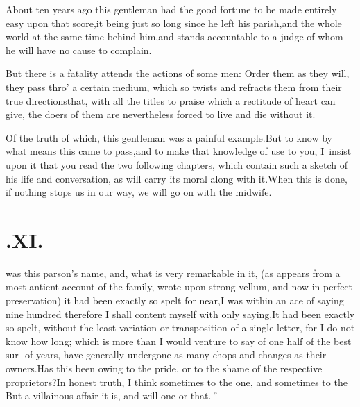 \documentclass{article}
\begin{document}
About ten years ago this gentleman had the good fortune to be
made entirely easy upon that score,\tsk  it being just so long
since he left his parish,\tsk  and the whole world at the same
time behind him,\tsk  and stands accountable to a judge of whom he
will have no cause to complain.

But there is a fatality attends the actions of some men: Order
them as they will, they pass thro’ a certain medium, which so twists and refracts them from their true
directions\tsh  that, with all the titles to praise which a
rectitude of heart can give, the doers of them are nevertheless
forced to live and die without it.

Of the truth of which, this gentleman was a painful
example.\tsh  But to know by what means this came to
pass,\tsk  and to make that knowledge of use to you, I~insist upon
it that you read the two following chapters, which contain such a
sketch of his life and conversation, as will carry its moral along
with it.\tsk  When this is done, if nothing stops us in our way,
we will go on with the midwife.

\section{.\enspace XI.}

 was this parson’s name, and, what is very remarkable in it, (as
appears from a most antient account of the family, wrote upon strong vellum, and
now in perfect preservation) it had been exactly so spelt for near,\tsk  I was
within an ace of saying nine hundred\break
{}
therefore I
shall content myself with only saying,\tsh  It had been exactly so spelt, without the
least variation or transposition of a single letter, for I do not know how long;
which is more than I would venture to say of one half of the best sur-\break 
{} of years, have generally undergone as many chops and
changes as their owners.\tsk  Has this been owing to the pride, or to the shame of
the respective proprietors?\tsk  In honest truth, I think sometimes to the one, and
sometimes to the  But a villainous affair
it is, and will one 
\lqq or that.\,” 
\end{document}
